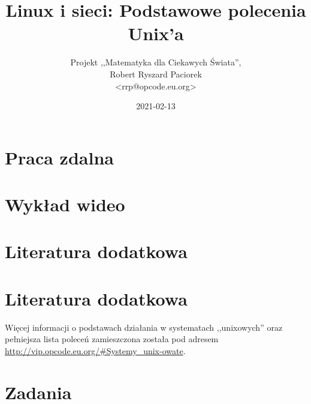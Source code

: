 \documentclass{pdfBooklets}
\title{Linux i sieci: Podstawowe polecenia Unix'a}
\author{%
	Projekt ,,Matematyka dla Ciekawych Świata'',\\
	Robert Ryszard Paciorek\\\normalsize\ttfamily <rrp@opcode.eu.org>
}
\date  {2021-02-13}
\begin{document}
\maketitle






\section{Praca zdalna}








\section{Wykład wideo}




\section{Literatura dodatkowa }


\section{Literatura dodatkowa}
 Więcej informacji o podstawach działania w systematach ,,unixowych'' oraz pełniejsza lista poleceń zamieszczona została pod adresem \url{http://vip.opcode.eu.org/#Systemy_unix-owate}.

\section{Zadania}




\end{document}
